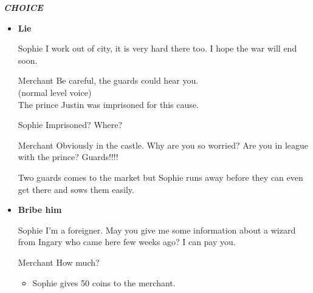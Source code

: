 \textit{\textbf{CHOICE}}
\begin{itemize}
\item \textbf{Lie}
  
\begin{screenplay}

\begin{dialogue}{Sophie}
I work out of city, it is very hard there too. I hope the war will end soon.
\end{dialogue}
  
\begin{dialogue}{Merchant}
Be careful, the guards could hear you. \\
\hspace{4em}(normal level voice) \\
The prince Justin was imprisoned for this cause.
\end{dialogue}
  
\begin{dialogue}[worried]{Sophie}
Imprisoned? Where? 
\end{dialogue}

\begin{dialogue}{Merchant}
Obviously in the castle. Why are you so worried? Are you in league with the prince? Guards!!!!
\end{dialogue}

  Two guards comes to the market but Sophie runs away before they can even get there and sows them easily.

\end{screenplay}
  
\item \textbf{Bribe him}
  
\begin{screenplay}

\begin{dialogue}[persuasive]{Sophie}
I'm a foreigner. May you give me some information about a wizard from Ingary who came here few weeks ago? I can pay you.
\end{dialogue}
  
\begin{dialogue}{Merchant}
How much?
\end{dialogue}

\end{screenplay}
  
  \begin{itemize}
  \item Sophie gives 50 coins to the merchant.


\end{itemize}
\end{itemize}
